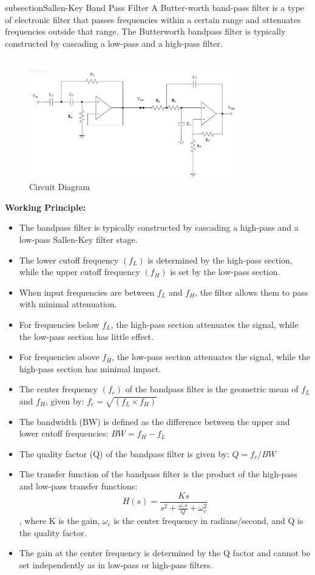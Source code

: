 \documentclass[a4paper,12pt]{article}
\begin{document}
subsection{Sallen-Key Band Pass Filter}
A Butter-worth band-pass filter is a type of electronic filter that passes frequencies within a certain range and attenuates frequencies outside that range. The Butterworth bandpass filter is typically constructed by cascading a low-pass and a high-pass filter.\\\\
\begin{figure}[H]
    \centering
    \includegraphics[width=0.8\textwidth]{fig/bpc.jpeg}
    \caption{Circuit Diagram}
    \label{fig:your-label}
\end{figure}
\textbf{Working Principle:}
\begin{itemize}
    \item The bandpass filter is typically constructed by cascading a high-pass and a low-pass Sallen-Key filter stage.
    \item The lower cutoff frequency $(f_L)$ is determined by the high-pass section, while the upper cutoff frequency $(f_H)$ is set by the low-pass section.
    \item When input frequencies are between $f_L$ and $f_H$, the filter allows them to pass with minimal attenuation.
    \item For frequencies below $f_L$, the high-pass section attenuates the signal, while the low-pass section has little effect.
    \item For frequencies above $f_H$, the low-pass section attenuates the signal, while the high-pass section has minimal impact.
    \item The center frequency $(f_c)$ of the bandpass filter is the geometric mean of $f_L$ and $f_H$, given by: $f_c = \sqrt{(f_L \times f_H)}$
    \item The bandwidth (BW) is defined as the difference between the upper and lower cutoff frequencies: $BW = f_H - f_L$
    \item The quality factor (Q) of the bandpass filter is given by: $Q = f_c / BW$
    \item The transfer function of the bandpass filter is the product of the high-pass and low-pass transfer functions:
    $$H(s)=\frac{Ks}{s^2+\frac{\omega _cs}{Q}+\omega _c ^2}$$,
    where K is the gain, $\omega _c$ is the center frequency in radians/second, and Q is the quality factor. 
    \item The gain at the center frequency is determined by the Q factor and cannot be set independently as in low-pass or high-pass filters.
\end{itemize}
\end{document}
